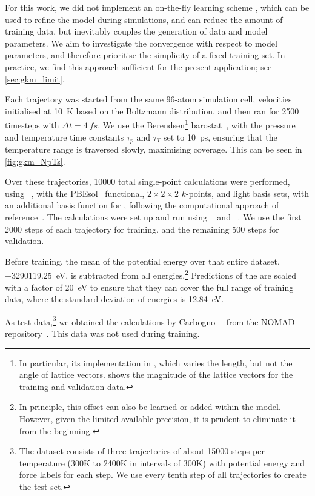 For this work, we did not implement an on-the-fly learning scheme \cite{lkd2015q}, which can be used to refine the model during simulations, and can reduce the amount of training data, but inevitably couples the generation of data and model parameters. We aim to investigate the convergence with respect to model parameters, and therefore prioritise the simplicity of a fixed training set. In practice, we find this approach sufficient for the present application; see \cref{sec:gkm_limit}.

Each trajectory was started from the same 96-atom simulation cell, velocities initialised at \qty{10}{K} based on the Boltzmann distribution, and then ran for \num{2500} timesteps with $\Delta t{=}\qty{4}{fs}$.
We use the Berendsen\footnote{In particular, its implementation in \ase, which varies the length, but not the angle of lattice vectors.  shows the magnitude of the lattice vectors for the training and validation data.} barostat~\cite{bpdh1984p}, with the pressure and temperature time constants $\tau_p$ and $\tau_T$ set to \qty{10}{ps}, ensuring that the temperature range is traversed slowly, maximising coverage. This can be seen in \cref{fig:gkm_NpTs}.

Over these trajectories, \num{10000} total single-point calculations were performed, using \aims~\cite{FHI-aims}, with the PBEsol~\cite{przb2008t} functional, $2\times2\times2$ $k$-points, and light basis sets, with an additional basis function for , following the computational approach of reference~\cite{crs2017t}. The calculations were set up and run using \vibes~\cite{FHI-vibes} and \ase~\cite{ase}. We use the first \num{2000} steps of each trajectory for training, and the remaining \num{500} steps for validation.

Before training, the mean of the potential energy over that entire dataset, \qty{-3290119.25}{eV}, is subtracted from all energies.\footnote{In principle, this offset can also be learned or added within the model. However, given the limited available precision, it is prudent to eliminate it from the beginning.} Predictions of the \mpnn are scaled with a factor of \qty{20}{eV} to ensure that they can cover the full range of training data, where the standard deviation of energies is \qty{12.84}{eV}.

As test data,\footnote{The dataset consists of three trajectories of about \num{15000} steps per temperature (\si{300}{K} to \si{2400}{K} in intervals of \si{300}{K}) with potential energy and force labels for each step. We use every tenth step of all trajectories to create the test set.} we obtained the calculations by Carbogno~\etal{}~\cite{crs2017t-data} from the NOMAD repository~\cite{NOMAD}. This data was not used during training.

